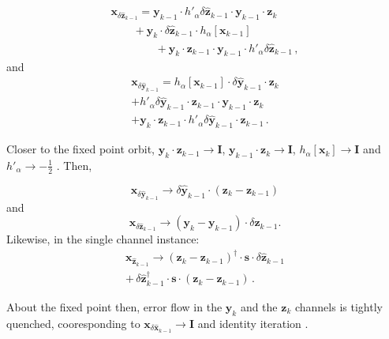 \documentclass[letterpaper,twocolumn,amsmath,amsfont,amssymb,english,aps,jcp,preprintnumbers,groupaddress,nofootinbib,tightenlines,floatfix]{revtex4}
\newcommand{\mat}[1]{\boldsymbol{#1}}
\theoremstyle{plain}
\theoremstyle{remark}
\theoremstyle{plain}
\begin{document}
\begin{multline}\label{dxdy}
 \mat{x}_{\delta \widehat{ \mat{z}}_{k-1}} =  {\mat{y}}_{k-1} \cdot  h'_\alpha \delta \widehat{ \mat{z}}_{k-1} \cdot  \mat{y}_{k-1}  \cdot \mat{z}_{k} \\
\qquad + \mat{y}_k \cdot  \delta \widehat{\mat{z}}_{k-1} \cdot   h_\alpha \left[ \mat{x}_{k-1} \right] \\
\qquad \qquad +  \mat{y}_{k} \cdot  \mat{z}_{k-1} \cdot {\mat{y}}_{k-1} \cdot h'_\alpha \delta \widehat{\mat{z}}_{k-1} \, ,
\end{multline}
and 
\begin{multline}\label{dxdz}
  \mat{x}_{\delta \widehat{ \mat{y}}_{k-1}} = h_\alpha \left[ \mat{x}_{k-1} \right]  \cdot \delta \widehat{\mat{y}}_{k-1} \cdot \mat{z}_{k} \\
+  h'_\alpha  \delta \widehat{\mat{y}}_{k-1} \cdot \mat{z}_{k-1} \cdot  \mat{y}_{k-1} \cdot  \mat{z}_{k} \\
 + \mat{y}_{k} \cdot \mat{z}_{k-1} \cdot h'_\alpha \delta \widehat{\mat{y}}_{k-1} \cdot \mat{z}_{k-1}  \, .
\end{multline}


Closer to the fixed point orbit,  $\mat{y}_k \cdot \mat{z}_{k-1} \rightarrow \mat{I}$, $\mat{y}_{k-1} \cdot \mat{z}_{k} \rightarrow \mat{I}$,
$h_\alpha \left[ \mat{x}_{k} \right] \rightarrow \mat{I}$ and $h'_\alpha \rightarrow - \frac{1}{2}$ \cite{higham2005}.  Then,

\begin{equation} \label{yorbit}
 \mat{x}_{\delta \widehat{ \mat{y}}_{k-1}} \rightarrow \delta \widehat{\mat{y}}_{k-1} \cdot \left( \mat{z}_k-\mat{z}_{k-1} \right)
\end{equation}
and
\begin{equation} \label{zorbit}
 \mat{x}_{\delta \widehat{ \mat{z}}_{k-1}} \rightarrow \left( \mat{y}_k-\mat{y}_{k-1} \right) \cdot \delta \widehat{\mat{z}}_{k-1} .
\end{equation}
Likewise, in the single channel instance:
\begin{multline}
 \mat{x}_{\widehat{\mat{z}}_{k-1}} \rightarrow  \left(  \mat{z}_{k} - \mat{z}_{k-1} \right)^\dagger \cdot \mat{s} \cdot \delta \widehat{\mat{z}}_{k-1} \\
+  \, \delta \widehat{\mat{z}}^\dagger_{k-1} \cdot  \mat{s}  \cdot \left(  \mat{z}_{k} - \mat{z}_{k-1} \right)  \, .
\end{multline}

About the fixed point then, error flow in the $\mat{y}_k$ and the $\mat{z}_k$ channels is tightly quenched,
cooresponding to $\mat{x}_{\delta \widehat{\mat{x}}_{k-1}} \rightarrow  \mat{I}$  and identity iteration \cite{higham2005}.
\end{document}
